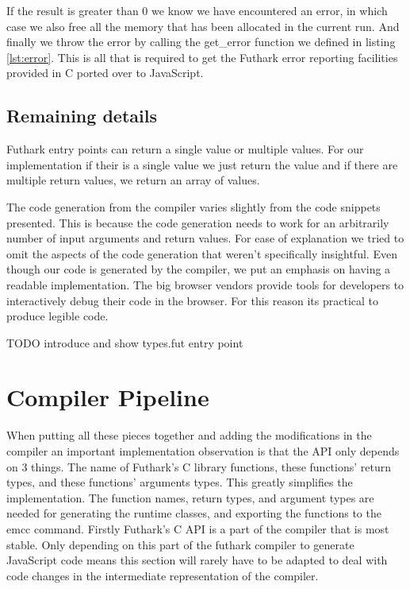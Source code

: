 \documentclass[11pt]{book}
\begin{document}
If the result is greater than 0 we know we have encountered an error, in which case we also free all the memory that has been allocated in the current run. And finally we throw the error by calling the get\_error function we defined in listing \ref{lst:error}. This is all that is required to get the Futhark error reporting facilities provided in C ported over to JavaScript.



\subsection{Remaining details}
Futhark entry points can return a single value or multiple values. For our implementation if their is a single value we just return the value and if there are multiple return values, we return an array of values. 

The code generation from the compiler varies slightly from the code snippets presented. This is because the code generation needs to work for an arbitrarily number of input arguments and return values. For ease of explanation we tried to omit the aspects of the code generation that weren't specifically insightful. Even though our code is generated by the compiler, we put an emphasis on having a readable implementation. The big browser vendors provide tools for developers to interactively debug their code in the browser. For this reason its practical to produce legible code.

TODO introduce and show types.fut entry point




\section{Compiler Pipeline}

When putting all these pieces together and adding the modifications in the compiler an important implementation observation is that the API only depends on 3 things. The name of Futhark's C library functions, these functions' return types, and these functions' arguments types. This greatly simplifies the implementation. The function names, return types, and argument types are needed for generating the runtime classes, and exporting the functions to the emcc command. Firstly Futhark's C API is a part of the compiler that is most stable. Only depending on this part of the futhark compiler to generate JavaScript code means this section will rarely have to be adapted to deal with code changes in the intermediate representation of the compiler.
\end{document}
